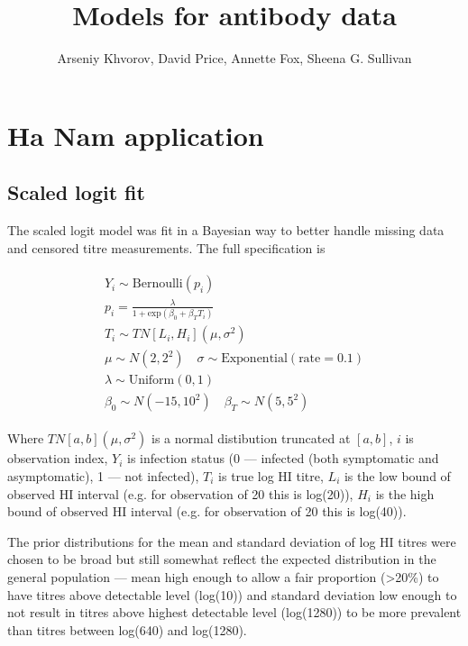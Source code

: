 \documentclass[12pt]{article}
\title{Models for antibody data}
\author{Arseniy Khvorov, David Price, Annette Fox, Sheena G. Sullivan}
\begin{document}
\maketitle


\section{Ha Nam application}

\subsection{Scaled logit fit}

The scaled logit model was fit in a Bayesian way to better handle missing data and censored titre measurements. The full specification is

\begin{align*}
\begin{gathered}
Y_i \sim \text{Bernoulli}(p_i) \\
p_i = \frac{\lambda}{1 + \text{exp}(\beta_0 + \beta_T T_i)} \\
T_i \sim TN[L_{i}, H_{i}](\mu, \sigma^2) \\
\mu \sim N(2, 2^2) \quad \sigma \sim \text{Exponential}(\text{rate} = 0.1) \\
\lambda \sim \text{Uniform}(0, 1) \\
\beta_0 \sim N(-15, 10^2) \quad \beta_T \sim N(5, 5^2)
\end{gathered}
\end{align*}

Where $TN[a, b](\mu, \sigma^2)$ is a normal distibution truncated at $[a, b]$, $i$ is observation index, $Y_i$ is infection status (0 --- infected (both symptomatic and asymptomatic), 1 --- not infected), $T_i$ is true log HI titre, $L_i$ is the low bound of observed HI interval (e.g. for observation of 20 this is log(20)), $H_i$ is the high bound of observed HI interval (e.g. for observation of 20 this is log(40)).

The prior distributions for the mean and standard deviation of log HI titres were chosen to be broad but still somewhat reflect the expected distribution in the general population --- mean high enough to allow a fair proportion (>20\%) to have titres above detectable level (log(10)) and standard deviation low enough to not result in titres above highest detectable level (log(1280)) to be more prevalent than titres between log(640) and log(1280).
\end{document}
